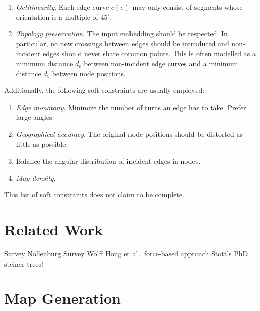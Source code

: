 \documentclass{sig-alternate-sigmod09}
\begin{document}
\begin{enumerate}
\setlength\itemsep{.1em}
\item \emph{Octilinearity}. Each edge curve $c(e)$ may only consist of segments whose orientation is a multiple of $45^{\circ}$.
\item \emph{Topology preservation}. The input embedding should be respected. In particular, no new crossings between edges should be introduced and non-incident edges should never share common points. This is often modelled as a minimum distance $d_{e}$ between non-incident edge curves and a minimum distance $d_{v}$ between node positions.
\end{enumerate}

Additionally, the following soft constraints are usually employed:

\begin{enumerate}
\setlength\itemsep{.1em}
\item \emph{Edge monotony}. Minimize the number of turns an edge has to take. Prefer large angles.
\item \emph{Geographical accuracy}. The original node positions should be distorted as little as possible.
\item \emph{} Balance the angular distribution of incident edges in nodes.
\item \emph{Map density}.
\end{enumerate}

This list of soft constraints does not claim to be complete. %

\section{Related Work}

Survey Nöllenburg %
Survey Wolff %
Hong et al., force-based approach
Stott's PhD
steiner trees! %

\section{Map Generation}
\end{document}
